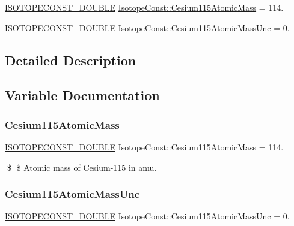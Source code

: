 \begin{DoxyCompactItemize}
\item 
\mbox{\hyperlink{group___isotope_const-_macros_ga8f45a7272ce02c0b4c65c44636ed719a}{I\+S\+O\+T\+O\+P\+E\+C\+O\+N\+S\+T\+\_\+\+D\+O\+U\+B\+LE}} \mbox{\hyperlink{group___isotope_const-_cesium-_cs115_gae0f63fb65b8bd8e5a0139c3aaf36dfdb}{Isotope\+Const\+::\+Cesium115\+Atomic\+Mass}} = 114.
\item 
\mbox{\hyperlink{group___isotope_const-_macros_ga8f45a7272ce02c0b4c65c44636ed719a}{I\+S\+O\+T\+O\+P\+E\+C\+O\+N\+S\+T\+\_\+\+D\+O\+U\+B\+LE}} \mbox{\hyperlink{group___isotope_const-_cesium-_cs115_gabb945ca09185d9382f1b28f07a67960c}{Isotope\+Const\+::\+Cesium115\+Atomic\+Mass\+Unc}} = 0.
\end{DoxyCompactItemize}


\subsection{Detailed Description}


\subsection{Variable Documentation}
\mbox{\label{group___isotope_const-_cesium-_cs115_gae0f63fb65b8bd8e5a0139c3aaf36dfdb}} 
\subsubsection{\texorpdfstring{Cesium115\+Atomic\+Mass}{Cesium115AtomicMass}}
{\footnotesize\ttfamily \mbox{\hyperlink{group___isotope_const-_macros_ga8f45a7272ce02c0b4c65c44636ed719a}{I\+S\+O\+T\+O\+P\+E\+C\+O\+N\+S\+T\+\_\+\+D\+O\+U\+B\+LE}} Isotope\+Const\+::\+Cesium115\+Atomic\+Mass = 114.}

\$ \$ Atomic mass of Cesium-\/115 in amu. \mbox{\label{group___isotope_const-_cesium-_cs115_gabb945ca09185d9382f1b28f07a67960c}} 
\subsubsection{\texorpdfstring{Cesium115\+Atomic\+Mass\+Unc}{Cesium115AtomicMassUnc}}
{\footnotesize\ttfamily \mbox{\hyperlink{group___isotope_const-_macros_ga8f45a7272ce02c0b4c65c44636ed719a}{I\+S\+O\+T\+O\+P\+E\+C\+O\+N\+S\+T\+\_\+\+D\+O\+U\+B\+LE}} Isotope\+Const\+::\+Cesium115\+Atomic\+Mass\+Unc = 0.}

